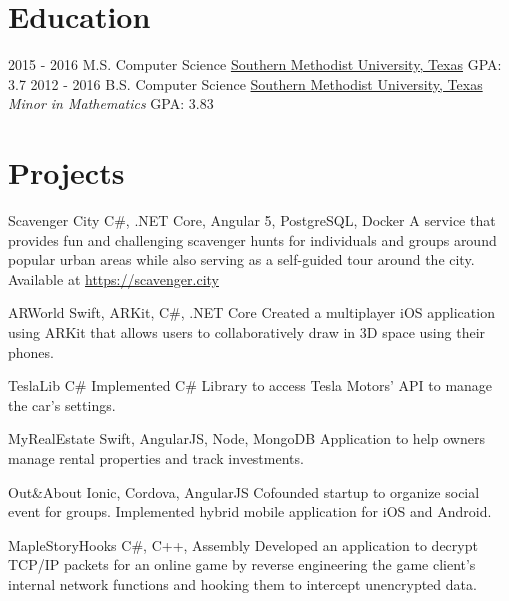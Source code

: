 \documentclass[letterpaper]{resume}
\begin{document}
\section{Education}
\begin{twenty}
	\twentyitem
	{2015 - 2016}
	{}
	{M.S. Computer Science }
	{\href{http://www.smu.edu/}{Southern Methodist University, Texas}}
	{GPA: 3.7}
	{}
	\twentyitem
	{2012 - 2016}
	{}
	{B.S. Computer Science }
	{\href{http://www.smu.edu/}{Southern Methodist University, Texas}}
	{\emph{Minor in Mathematics}}
	{GPA: 3.83}
\end{twenty}


\section{Projects}

\project
{Scavenger City}
{C\#, .NET Core, Angular 5, PostgreSQL, Docker}
{A service that provides fun and challenging scavenger hunts for individuals and groups around popular urban areas while also serving as a self-guided tour around the city. Available at \url{https://scavenger.city}}

\project
{ARWorld}
{Swift, ARKit, C\#, .NET Core}
{Created a multiplayer iOS application using ARKit that allows users to collaboratively draw in 3D space using their phones.}

\project
{TeslaLib}
{C\#}
{Implemented C\# Library to access Tesla Motors’ API to manage the car’s settings.}

\project
{MyRealEstate}
{Swift, AngularJS, Node, MongoDB}
{Application to help owners manage rental properties and track investments.}

\project
{Out\&About}
{Ionic, Cordova, AngularJS}
{Cofounded startup to organize social event for groups. Implemented hybrid mobile application for iOS and Android.}

\project
{MapleStoryHooks}
{C\#, C++, Assembly}
{Developed an application to decrypt TCP/IP packets for an online game by reverse engineering the game client’s internal network functions and hooking them to intercept unencrypted data.}
		
\end{document}
